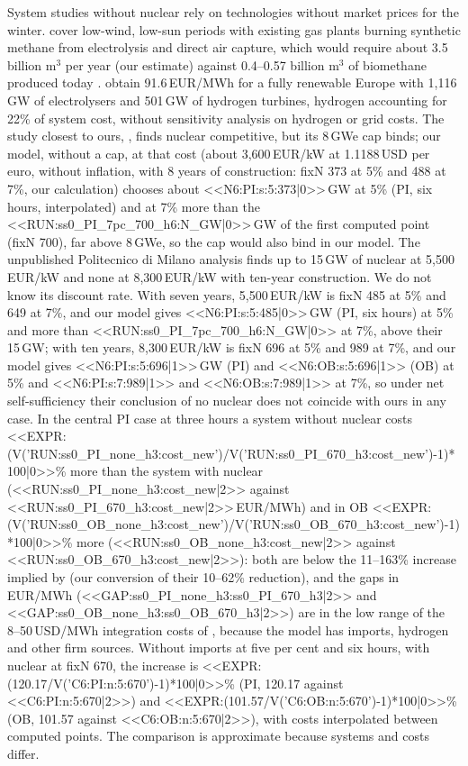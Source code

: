 System studies without nuclear rely on technologies without market prices for the winter. \citet{Lombardi2020} cover low-wind, low-sun periods with existing gas plants burning synthetic methane from electrolysis and direct air capture, which would require about 3.5 billion m$^3$ per year (our estimate) against 0.4--0.57 billion m$^3$ of biomethane produced today \citep{Biometano2024}. \citet{Franzmann2026} obtain 91.6\,EUR/MWh for a fully renewable Europe with 1{,}116\,GW of electrolysers and 501\,GW of hydrogen turbines, hydrogen accounting for 22\% of system cost, without sensitivity analysis on hydrogen or grid costs. The study closest to ours, \citet{Mastrantuono2026}, finds nuclear competitive, but its 8\,GWe cap binds; our model, without a cap, at that cost (about 3{,}600\,EUR/kW at 1.1188\,USD per euro, without inflation, with 8 years of construction: fixN 373 at 5\% and 488 at 7\%, our calculation) chooses about <<N6:PI:s:5:373|0>>\,GW at 5\% (PI, six hours, interpolated) and at 7\% more than the <<RUN:ss0_PI_7pc_700_h6:N_GW|0>>\,GW of the first computed point (fixN 700), far above 8\,GWe, so the cap would also bind in our model. The unpublished Politecnico di Milano analysis \citep{PoliMi2026} finds up to 15\,GW of nuclear at 5{,}500\,EUR/kW and none at 8{,}300\,EUR/kW with ten-year construction. We do not know its discount rate. With seven years, 5{,}500\,EUR/kW is fixN 485 at 5\% and 649 at 7\%, and our model gives <<N6:PI:s:5:485|0>>\,GW (PI, six hours) at 5\% and more than <<RUN:ss0_PI_7pc_700_h6:N_GW|0>> at 7\%, above their 15\,GW; with ten years, 8{,}300\,EUR/kW is fixN 696 at 5\% and 989 at 7\%, and our model gives <<N6:PI:s:5:696|1>>\,GW (PI) and <<N6:OB:s:5:696|1>> (OB) at 5\% and <<N6:PI:s:7:989|1>> and <<N6:OB:s:7:989|1>> at 7\%, so under net self-sufficiency their conclusion of no nuclear does not coincide with ours in any case. In the central PI case at three hours a system without nuclear costs <<EXPR:(V('RUN:ss0_PI_none_h3:cost_new')/V('RUN:ss0_PI_670_h3:cost_new')-1)*100|0>>\% more than the system with nuclear (<<RUN:ss0_PI_none_h3:cost_new|2>> against <<RUN:ss0_PI_670_h3:cost_new|2>>\,EUR/MWh) and in OB <<EXPR:(V('RUN:ss0_OB_none_h3:cost_new')/V('RUN:ss0_OB_670_h3:cost_new')-1)*100|0>>\% more (<<RUN:ss0_OB_none_h3:cost_new|2>> against <<RUN:ss0_OB_670_h3:cost_new|2>>): both are below the 11--163\% increase implied by \citet{Sepulveda2018} (our conversion of their 10--62\% reduction), and the gaps in EUR/MWh (<<GAP:ss0_PI_none_h3:ss0_PI_670_h3|2>> and <<GAP:ss0_OB_none_h3:ss0_OB_670_h3|2>>) are in the low range of the 8--50\,USD/MWh integration costs of \citet{NEA2019}, because the model has imports, hydrogen and other firm sources. Without imports at five per cent and six hours, with nuclear at fixN 670, the increase is <<EXPR:(120.17/V('C6:PI:n:5:670')-1)*100|0>>\% (PI, 120.17 against <<C6:PI:n:5:670|2>>) and <<EXPR:(101.57/V('C6:OB:n:5:670')-1)*100|0>>\% (OB, 101.57 against <<C6:OB:n:5:670|2>>), with costs interpolated between computed points. The comparison is approximate because systems and costs differ.

